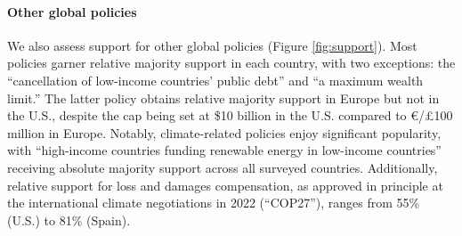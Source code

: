 \documentclass{nature}
\makeatletter
\renewenvironment*{figure}{\@float{figure}}{\end@float}
\makeatother
\begin{document}


\paragraph{Other global policies}\label{subsubsec:support_other_global_policies} %

We also assess support for other global policies (Figure \ref{fig:support}). Most policies garner relative majority support in each country, with two exceptions: the ``cancellation of low-income countries' public debt'' and ``a maximum wealth limit.'' The latter policy obtains relative majority support in Europe but not in the U.S., despite the cap being set at \$10 billion in the U.S. compared to \euro{}/£100 million in Europe. Notably, climate-related policies enjoy significant popularity, with ``high-income countries funding renewable energy in low-income countries'' receiving absolute majority support across all surveyed countries. Additionally, relative support for loss and damages compensation, as approved in principle at the international climate negotiations in 2022 (``COP27''), ranges from 55\% (U.S.) to 81\% (Spain).
\end{document}
